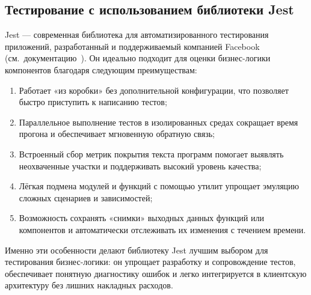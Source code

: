 \subsection{Тестирование с использованием библиотеки Jest}

Jest — современная библиотека для автоматизированного тестирования приложений, разработанный и поддерживаемый компанией Facebook (см.~документацию~\cite{jest_docs}). Он идеально подходит для оценки бизнес-логики компонентов благодаря следующим преимуществам:
\begin{enumerate}
  \item Работает «из коробки» без дополнительной конфигурации, что позволяет быстро приступить к написанию тестов;
  \item Параллельное выполнение тестов в изолированных средах сокращает время прогона и обеспечивает мгновенную обратную связь;
  \item Встроенный сбор метрик покрытия текста программ помогает выявлять неохваченные участки и поддерживать высокий уровень качества;
  \item Лёгкая подмена модулей и функций с помощью утилит упрощает эмуляцию сложных сценариев и зависимостей;
  \item Возможность сохранять «снимки» выходных данных функций или компонентов и автоматически отслеживать их изменения с течением времени.
\end{enumerate}

Именно эти особенности делают библиотеку Jest лучшим выбором для тестирования бизнес-логики: он упрощает разработку и сопровождение тестов, обеспечивает понятную диагностику ошибок и легко интегрируется в клиентскую архитектуру без лишних накладных расходов.
